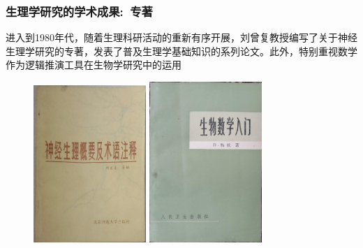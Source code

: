 \frame
{
	\frametitle{生理学研究的学术成果:~专著}
	进入到\textrm{1980}年代，随着生理科研活动的重新有序开展，刘曾复教授编写了关于神经生理学研究的专著，发表了普及生理学基础知识的系列论文。此外，特别重视数学作为逻辑推演工具在生物学研究中的运用
\begin{figure}[h!] 
\centering
\vspace{-0.05in}
\includegraphics[height=0.52\textwidth,width=0.38\textwidth,clip]{Figures_Peking-Opera/Liu-Neurophysiology-1.jpg}
\includegraphics[height=0.52\textwidth,width=0.38\textwidth,clip]{Figures_Peking-Opera/Liu-Mathematic.jpg}
\label{Liu-Anatomy_and_Physiology-college}
\end{figure}
}

